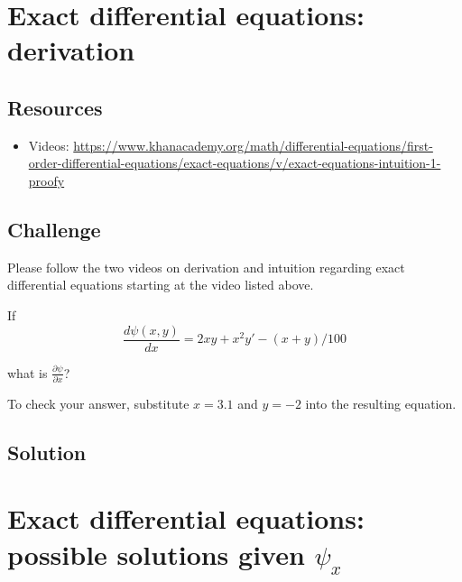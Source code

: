 \timebox




\newpage
\section{Exact differential equations: derivation}

\subsection*{Resources}
\begin{itemize}
    \item Videos: \url{https://www.khanacademy.org/math/differential-equations/first-order-differential-equations/exact-equations/v/exact-equations-intuition-1-proofy}
\end{itemize}

\subsection*{Challenge}
Please follow the two videos on derivation and intuition regarding exact differential equations starting at the video listed above.

If
\begin{equation}
    \frac{d \psi(x,y)}{dx} = 2xy + x^2y' - (x+y)/100
\end{equation}

what is $\displaystyle \frac{\partial \psi}{\partial x}$?

To check your answer, substitute $x=3.1$ and $y=-2$ into the resulting equation.

\subsection*{Solution}
\six{}

\timebox




\newpage
\section{Exact differential equations: possible solutions given $\psi_x$}

